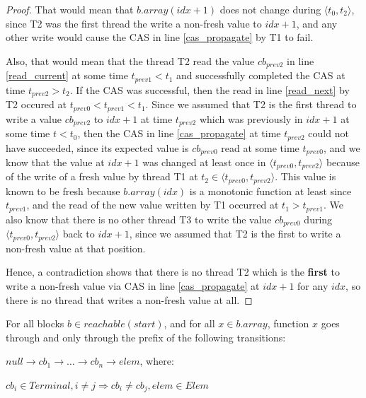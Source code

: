 \documentclass[runningheads,a4paper]{llncs}
\begin{document}
\begin{proof}
That would mean that $b.array(idx + 1)$ does not change during $\langle t_0, t_2 \rangle$,
since T2 was the first thread the write a non-fresh value to $idx + 1$, and any
other write would cause the CAS in line \ref{cas_propagate} by T1 to fail.

Also, that would mean that the thread T2 read the value
$cb_{prev2}$ in line \ref{read_current} at some time $t_{prev1} < t_1$
and successfully completed the CAS at time $t_{prev2} > t_2$. If the
CAS was successful, then the read in line \ref{read_next} by T2
occured at $t_{prev0} < t_{prev1} < t_1$. Since we assumed that T2 is the
first thread to write a value $cb_{prev2}$ to $idx + 1$ at time $t_{prev2}$
which was previously in $idx + 1$ at some time $t < t_0$, then the CAS
in line \ref{cas_propagate} at time $t_{prev2}$ could not have succeeded,
since its expected value is $cb_{prev0}$ read at some time $t_{prev0}$, and
we know that the value at $idx + 1$ was changed at least once in $\langle t_{prev0}, t_{prev2} \rangle$
because of the write of a fresh value by thread T1 at $t_2 \in \langle t_{prev0}, t_{prev2} \rangle$.
This value is known to be fresh because $b.array(idx)$ is a monotonic
function at least since $t_{prev1}$, and the read of the new value
written by T1 occurred at $t_1 > t_{prev1}$.
We also know that there is no other thread T3 to write the value
 $cb_{prev0}$ during $\langle t_{prev0}, t_{prev2} \rangle$
back to $idx + 1$, since we assumed that T2 is the first to write
a non-fresh value at that position.

Hence, a contradiction shows that there is no thread T2 which is the \textbf{first}
to write a non-fresh value via CAS in line \ref{cas_propagate} at $idx + 1$
for any $idx$, so there is no thread that writes a non-fresh value at all.
\end{proof}


\begin{lemma}[Lifecycle]\label{lemma-lifecycle}
For all blocks $b \in reachable(start)$, and for all $x \in b.array$, function $x$ goes through and only through the prefix of the following transitions:

$null \rightarrow cb_1 \rightarrow \dots \rightarrow cb_n \rightarrow elem$, where:

$cb_i \in Terminal, i \neq j \Rightarrow cb_i \neq cb_j, elem \in Elem$
\end{lemma}
\end{document}
